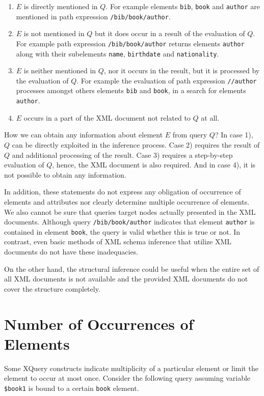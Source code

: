 \begin{enumerate}[1)]
\item $E$ is directly mentioned in $Q$. For example elements \texttt{bib}, \texttt{book} and \texttt{author} are mentioned in path expression \texttt{/bib/book/author}.
\item $E$ is not mentioned in $Q$ but it does occur in a result of the evaluation of $Q$. For example path expression \texttt{/bib/book/author} returns elements \texttt{author} along with their subelements \texttt{name}, \texttt{birthdate} and \texttt{nationality}.
\item $E$ is neither mentioned in $Q$, nor it occurs in the result, but it is processed by the evaluation of $Q$. For example the evaluation of path expression \texttt{//author} processes amongst others elements \texttt{bib} and \texttt{book}, in a search for elements \texttt{author}.
\item $E$ occurs in a part of the XML document not related to $Q$ at all.
\end{enumerate}

How we can obtain any information about element $E$ from query $Q$? In case 1), $Q$ can be directly exploited in the inference process. Case 2) requires the result of $Q$ and additional processing of the result. Case 3) requires a step-by-step evaluation of $Q$, hence, the XML document is also required. And in case 4), it is not possible to obtain any information. 

In addition, these statements do not express any obligation of occurrence of elements and attributes nor clearly determine multiple occurrence of elements. We also cannot be sure that queries target nodes actually presented in the XML documents. Although query \texttt{/bib/book/author} indicates that element \texttt{author} is contained in element \texttt{book}, the query is valid whether this is true or not. In contrast, even basic methods of XML schema inference that utilize XML documents do not have these inadequacies.

On the other hand, the structural inference could be useful when the entire set of all XML documents is not available and the provided XML documents do not cover the structure completely.

\section{Number of Occurrences of Elements}
Some XQuery constructs indicate multiplicity of a particular element or limit the element to occur at most once. Consider the following query assuming variable \texttt{\$book1} is bound to a certain \texttt{book} element.

